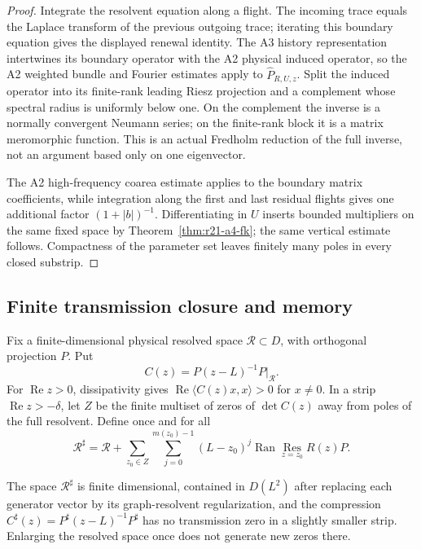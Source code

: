 \begin{proof}
Integrate the resolvent equation along a flight.  The incoming trace equals
the Laplace transform of the previous outgoing trace; iterating this boundary
equation gives the displayed renewal identity.  The A3 history representation
intertwines its boundary operator with the A2 physical induced operator, so
the A2 weighted bundle and Fourier estimates apply to
$\widehat P_{R,U,z}$.  Split the induced operator into its finite-rank leading
Riesz projection and a complement whose spectral radius is uniformly below
one.  On the complement the inverse is a normally convergent Neumann series;
on the finite-rank block it is a matrix meromorphic function.  This is an
actual Fredholm reduction of the full inverse, not an argument based only on
one eigenvector.

The A2 high-frequency coarea estimate applies to the boundary matrix
coefficients, while integration along the first and last residual flights
gives one additional factor $(1+|b|)^{-1}$.  Differentiating in $U$ inserts
bounded multipliers on the same fixed space by
Theorem~\ref{thm:r21-a4-fk}; the same vertical estimate follows.  Compactness
of the parameter set leaves finitely many poles in every closed substrip.
\end{proof}

\subsection{Finite transmission closure and memory}

Fix a finite-dimensional physical resolved space $\mathcal R\subset D$, with
orthogonal projection $P$.  Put
\[
 C(z)=P(z-L)^{-1}P|_{\mathcal R}.
\]
For $\operatorname{Re}z>0$, dissipativity gives
$\operatorname{Re}\langle C(z)x,x\rangle>0$ for $x\ne0$.
In a strip $\operatorname{Re}z>-\delta$, let $Z$ be the finite multiset of
zeros of $\det C(z)$ away from poles of the full resolvent.  Define once and
for all
\[
 \mathcal R^\sharp=\mathcal R+
 \sum_{z_0\in Z}\sum_{j=0}^{m(z_0)-1}
 (L-z_0)^j\operatorname{Ran}\operatorname*{Res}_{z=z_0}R(z)P.
\]

\begin{lemma}
\label{lem:r21-a4-transmission}
The space $\mathcal R^\sharp$ is finite dimensional, contained in $D(L^2)$
after replacing each generator vector by its graph-resolvent regularization,
and the compression
$C^\sharp(z)=P^\sharp(z-L)^{-1}P^\sharp$ has no transmission zero in a
slightly smaller strip.  Enlarging the resolved space once does not generate
new zeros there.
\end{lemma}

